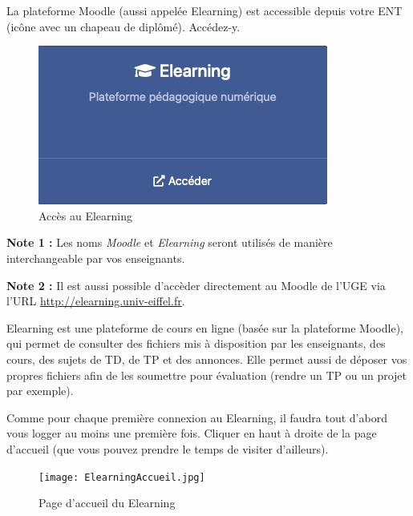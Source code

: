 \documentclass{article}
\begin{document}
\begin{exercice}

La plateforme Moodle (aussi appelée Elearning) est accessible depuis votre ENT
(icône avec un chapeau de diplômé). Accédez-y.

\begin{figure}[h!]
    \begin{center}
    \includegraphics[scale=0.25]{iconeElearning.jpg}
    \caption{Accès au Elearning}
     \end{center}
\end{figure}    

\medskip

\textbf{Note 1 : } Les noms \emph{Moodle} et \emph{Elearning} seront utilisés de manière
interchangeable par vos enseignants.

\medskip

\textbf{Note 2 :} Il est aussi possible d'accèder directement au Moodle de l'UGE via l'URL
\url{http://elearning.univ-eiffel.fr}.

\medskip

Elearning est une plateforme de cours en ligne (basée sur la plateforme Moodle),  qui permet de consulter des
fichiers mis à disposition par les enseignants,  des cours, des sujets de TD, de TP et des
annonces. Elle permet aussi de déposer vos propres fichiers afin de les
soumettre pour évaluation (rendre un TP ou un projet par exemple).

Comme pour chaque première connexion au Elearning, il faudra tout d'abord vous logger au moins une première fois. 
Cliquer en haut à droite de la page d'accueil (que vous pouvez prendre le temps de visiter d'ailleurs).

\begin{figure}[h!]
    \begin{center}
    \texttt{[image: ElearningAccueil.jpg]}
    \caption{Page d'accueil du Elearning}
     \end{center}
\end{figure}    


\end{exercice}
\end{document}
